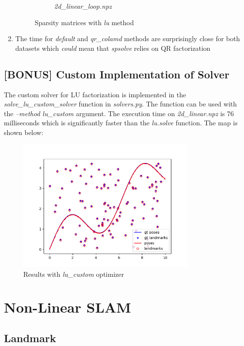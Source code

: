 \documentclass[12pt, a4paper]{article}
\begin{document}
\begin{enumerate}
\begin{figure}[H]
\begin{subfigure}[b]{0.45\textwidth}
      \caption{\textit{2d\_linear\_loop.npz}}
    \end{subfigure}
    \caption{Sparsity matrices with \textit{lu} method}
  \end{figure}
  
  \item The time for \textit{default} and \textit{qr\_colamd} methods are surprisingly close for both datasets which \textit{could} mean that \textit{spsolve} relies on QR factorization
\end{enumerate}
\subsection{[BONUS] Custom Implementation of Solver}
The custom solver for LU factorization is implemented in the \textit{solve\_lu\_custom\_solver} function in \textit{solvers.py}. The function can be used with the \textit{--method lu\_custom} argument. The execution time on \textit{2d\_linear.npz} is 76 milliseconds which is significantly faster than the \textit{lu.solve} function. The map is shown below:
\begin{figure}[H]
  \centering
  \includegraphics[width=0.8\textwidth]{./results/linear/lu_custom_2d_linear_map.png}
  \caption{Results with \textit{lu\_custom} optimizer}
\end{figure}
\section{Non-Linear SLAM}
\subsection{Landmark}
\end{document}
